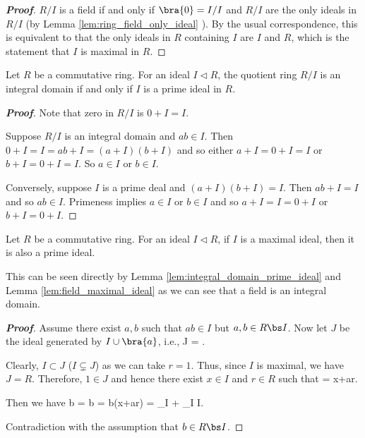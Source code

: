 


\begin{proof}[\bf Proof]
$R/I$ is a field if and only if $\bra{0} = I/I$ and $R/I$ are the only ideals in $R/I$ (by Lemma \ref{lem:ring_field_only_ideal} ). By the usual correspondence, this is equivalent to that the only ideals in $R$ containing $I$ are $I$ and $R$, which is the statement that $I$ is maximal in $R$.
\end{proof}

\begin{lemma}\label{lem:integral_domain_prime_ideal}
Let $R$ be a commutative ring. For an ideal $I \lhd R$, the quotient ring $R/I$ is an integral domain if and only if $I$ is a prime ideal in $R$.
\end{lemma}

\begin{proof}[\bf Proof]
Note that zero in $R/I$ is $0 + I = I$.

Suppose $R/I$ is an integral domain and $ab \in I$. Then $0 + I = I = ab+I = (a+I)(b+I)$ and so either $a + I = 0 + I = I$ or $b + I = 0 + I = I$. So $a \in I$ or $b \in I$.

Conversely, suppose $I$ is a prime deal and $(a + I)(b + I) = I$. Then $ab + I = I$ and so $ab \in I$. Primeness implies $a \in I$ or $b \in I$ and so $a + I = I = 0 + I$ or $b + I = 0 + I$.
\end{proof}

\begin{theorem}\label{thm:cr_maximal_ideal_implies_prime}
Let $R$ be a commutative ring. For an ideal $I \lhd R$, if $I$ is a maximal ideal, then it is also a prime ideal.
\end{theorem}

\begin{remark}
This can be seen directly by Lemma \ref{lem:integral_domain_prime_ideal} and Lemma \ref{lem:field_maximal_ideal} as we can see that a field is an integral domain.
\end{remark}

\begin{proof}[\bf Proof]
Assume there exist $a,b$ such that $ab\in I$ but $a,b\in R\bs I$. Now let $J$ be the ideal generated by $I\cup \bra{a}$, i.e.,
\be
J = .
\ee

Clearly, $I\subset J$ ($I \subsetneq J$) as we can take $r=1$. Thus, since $I$ is maximal, we have $J = R$. Therefore, $1\in J$ and hence there exist $x\in I$ and $r\in R$ such that
 = x+ar.
\ee

Then we have
\be
b = b = b(x+ar) = _{\in I} + _{\in I} \in I.
\ee

Contradiction with the assumption that $b\in R\bs I$.
\end{proof}

